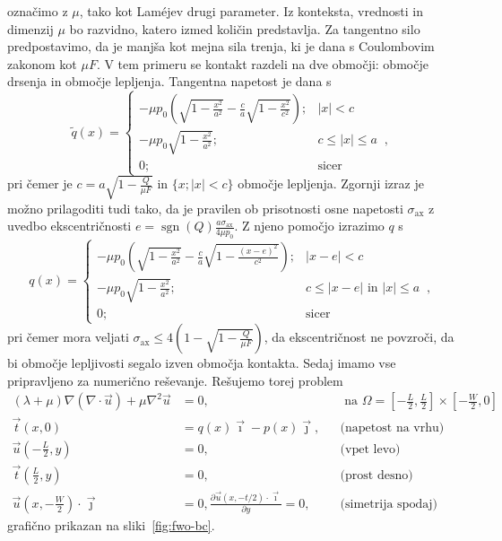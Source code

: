 \documentclass[12pt,a4paper,twoside]{article}
\theoremstyle{definition} %
\theoremstyle{plain} %
\numberwithin{equation}{section}
\newcommand{\dpar}[2]{\ensuremath{\frac{\partial #1}{\partial #2}}}
\newcommand{\vt}{\vec{t}}
\newcommand{\vu}{\vec{u}}
\newcommand{\vi}{\vec{\imath}}
\newcommand{\vj}{\vec{\jmath}}
\newcommand{\sax}{\ensuremath{\sigma_{\text{ax}}}}
\DeclareMathOperator{\sgn}{sgn}
\begin{document}
označimo z $\mu$, tako kot Lam\'ejev drugi parameter. Iz konteksta, vrednosti in dimenzij $\mu$ bo
razvidno, katero izmed količin predstavlja. Za tangentno silo predpostavimo, da je manjša kot mejna
sila trenja, ki je dana s Coulombovim zakonom kot $\mu F$. V tem primeru se kontakt razdeli na dve
območji: območje drsenja in območje lepljenja. Tangentna napetost je dana s
\begin{equation}
  \tilde q(x) = \begin{cases}
      -\mu p_0 \left(\sqrt{1 - \frac{x^2}{a^2}} - \frac{c}{a}\sqrt{1 - \frac{x^2}{c^2}}\right);& |x|
      < c \\
      -\mu p_0 \sqrt{1 - \frac{x^2}{a^2}}; & c \leq |x| \leq a \;\;,\\
      0; & \text{sicer}
    \end{cases}
\end{equation}
pri čemer je $c = a\sqrt{1 - \frac{Q}{\mu F}}$ in $\{x; |x| < c\}$ območje lepljenja.
Zgornji izraz je možno prilagoditi tudi tako, da je pravilen ob prisotnosti osne napetosti
$\sax$ z uvedbo ekscentričnosti $e = \sgn(Q)\frac{a \sax}{4 \mu p_0}$.
Z njeno pomočjo izrazimo $q$ s
\begin{equation}
q(x) = \begin{cases}
-\mu p_0 \left(\sqrt{1 - \frac{x^2}{a^2}} - \frac{c}{a}\sqrt{1 - \frac{(x-e)^2}{c^2}}\right); &
|x-e| < c \\
-\mu p_0 \sqrt{1 - \frac{x^2}{a^2}}; & c \leq | x - e | \text{ in } |x| \leq a  \;\;,\\
0; & \text{sicer}
\end{cases}
\end{equation}
pri čemer mora veljati $\sax \leq 4\left( 1 - \sqrt{1-\frac{Q}{\mu F}} \right)$, da ekscentričnost
ne povzroči, da bi območje lepljivosti segalo izven območja kontakta. Sedaj imamo vse pripravljeno
za numerično reševanje. Rešujemo torej problem
\begin{align}
  (\lambda + \mu) \nabla(\nabla\cdot \vu) + \mu \nabla^2 \vu &= 0, && \text{ na } \Omega =
  [-\frac{L}{2}, \frac{L}{2}]\times[-\frac{W}{2}, 0] \nonumber  \\
  \vt(x, 0) &= q(x)\vi - p(x)\vj, && \text{(napetost na vrhu)} \nonumber \\
    \vu(-\frac{L}{2}, y) &= 0,  && \text{(vpet levo)} \label{eq:fwo-problem}\\
    \vt(\frac{L}{2}, y) &= 0, \nonumber  && \text{(prost desno)}\\
    \vu(x, -\frac{W}{2})\cdot \vj &= 0, \dpar{\vu(x, -t/2)\cdot \vi}{y} = 0, \nonumber  && \text{(simetrija
    spodaj)}
\end{align}
grafično prikazan na sliki~\ref{fig:fwo-bc}.
\end{document}
